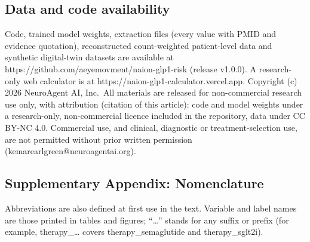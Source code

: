 \documentclass[
  11pt,
]{article}
\begin{document}
\subsection{Data and code
availability}\label{data-and-code-availability}

Code, trained model weights, extraction files (every value with PMID and
evidence quotation), reconstructed count-weighted patient-level data and
synthetic digital-twin datasets are available at
https://github.com/aeyemovment/naion-glp1-risk (release v1.0.0). A
research-only web calculator is at
https://naion-glp1-calculator.vercel.app. Copyright (c) 2026 NeuroAgent
AI, Inc.~All materials are released for non-commercial research use
only, with attribution (citation of this article): code and model
weights under a research-only, non-commercial licence included in the
repository, data under CC BY-NC 4.0. Commercial use, and clinical,
diagnostic or treatment-selection use, are not permitted without prior
written permission (kemarearlgreen@neuroagentai.org).

\subsection{Supplementary Appendix:
Nomenclature}\label{supplementary-appendix-nomenclature}

Abbreviations are also defined at first use in the text. Variable and
label names are those printed in tables and figures; ``\ldots{}'' stands
for any suffix or prefix (for example, therapy\_\ldots{} covers
therapy\_semaglutide and therapy\_sglt2i).
\end{document}
